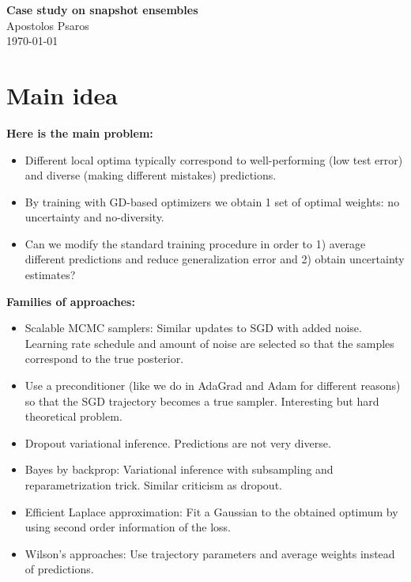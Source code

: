 


\usepackage{subcaption}

\usepackage[english]{babel}
\usepackage{blindtext}
\usepackage{amsmath}

	
	\sloppy
	
	\begin{center}	
		\Large
		\textbf{Case study on snapshot ensembles}\\
		\large
		Apostolos Psaros\\	
		\today
	\end{center}
	\vskip 0.5in
	
\section{Main idea}
\noindent
\textbf{Here is the main problem:}
\begin{itemize}
	\item Different local optima typically correspond to well-performing (low test error) and diverse (making different mistakes) predictions. 
	\item By training with GD-based optimizers we obtain 1 set of optimal weights: no uncertainty and no-diversity.
	\item Can we modify the standard training procedure in order to 1) average different predictions and reduce generalization error and 2) obtain uncertainty estimates?
\end{itemize}
\textbf{Families of approaches:}
\begin{itemize}
	\item Scalable MCMC samplers: Similar updates to SGD with added noise. 
	Learning rate schedule and amount of noise are selected so that the samples correspond to the true posterior.
	\item Use a preconditioner (like we do in AdaGrad and Adam for different reasons) so that the SGD trajectory becomes a true sampler. 
	Interesting but hard theoretical problem.
	\item Dropout variational inference. Predictions are not very diverse. 
	\item Bayes by backprop: Variational inference with subsampling and reparametrization trick. Similar criticism as dropout.
	\item Efficient Laplace approximation: Fit a Gaussian to the obtained optimum by using second order information of the loss. 
	\item Wilson's approaches: Use trajectory parameters and average weights instead of predictions.	
\end{itemize}
